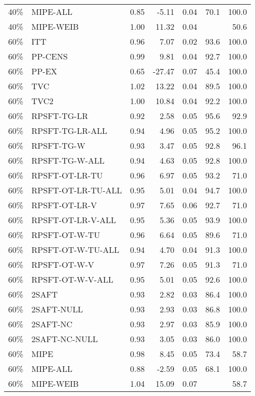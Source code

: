 \begin{table}[ht]
{\begin{tabular}{llrrrrr}
  40\% & MIPE-ALL & 0.85 & -5.11 & 0.04 & 70.1 & 100.0 \\ 
  40\% & MIPE-WEIB & 1.00 & 11.32 & 0.04 &  & 50.6 \\ 
   \hline
60\% & ITT & 0.96 & 7.07 & 0.02 & 93.6 & 100.0 \\ 
  60\% & PP-CENS & 0.99 & 9.81 & 0.04 & 92.7 & 100.0 \\ 
  60\% & PP-EX & 0.65 & -27.47 & 0.07 & 45.4 & 100.0 \\ 
  60\% & TVC & 1.02 & 13.22 & 0.04 & 89.5 & 100.0 \\ 
  60\% & TVC2 & 1.00 & 10.84 & 0.04 & 92.2 & 100.0 \\ 
   \hline
60\% & RPSFT-TG-LR & 0.92 & 2.58 & 0.05 & 95.6 & 92.9 \\ 
  60\% & RPSFT-TG-LR-ALL & 0.94 & 4.96 & 0.05 & 95.2 & 100.0 \\ 
  60\% & RPSFT-TG-W & 0.93 & 3.47 & 0.05 & 92.8 & 96.1 \\ 
  60\% & RPSFT-TG-W-ALL & 0.94 & 4.63 & 0.05 & 92.8 & 100.0 \\ 
  60\% & RPSFT-OT-LR-TU & 0.96 & 6.97 & 0.05 & 93.2 & 71.0 \\ 
  60\% & RPSFT-OT-LR-TU-ALL & 0.95 & 5.01 & 0.04 & 94.7 & 100.0 \\ 
  60\% & RPSFT-OT-LR-V & 0.97 & 7.65 & 0.06 & 92.7 & 71.0 \\ 
  60\% & RPSFT-OT-LR-V-ALL & 0.95 & 5.36 & 0.05 & 93.9 & 100.0 \\ 
   \hline
60\% & RPSFT-OT-W-TU & 0.96 & 6.64 & 0.05 & 89.6 & 71.0 \\ 
  60\% & RPSFT-OT-W-TU-ALL & 0.94 & 4.70 & 0.04 & 91.3 & 100.0 \\ 
  60\% & RPSFT-OT-W-V & 0.97 & 7.26 & 0.05 & 91.3 & 71.0 \\ 
  60\% & RPSFT-OT-W-V-ALL & 0.95 & 5.01 & 0.05 & 92.6 & 100.0 \\ 
   \hline
60\% & 2SAFT & 0.93 & 2.82 & 0.03 & 86.4 & 100.0 \\ 
  60\% & 2SAFT-NULL & 0.93 & 2.93 & 0.03 & 86.8 & 100.0 \\ 
  60\% & 2SAFT-NC & 0.93 & 2.97 & 0.03 & 85.9 & 100.0 \\ 
  60\% & 2SAFT-NC-NULL & 0.93 & 3.05 & 0.03 & 86.0 & 100.0 \\ 
  60\% & MIPE & 0.98 & 8.45 & 0.05 & 73.4 & 58.7 \\ 
  60\% & MIPE-ALL & 0.88 & -2.59 & 0.05 & 68.1 & 100.0 \\ 
  60\% & MIPE-WEIB & 1.04 & 15.09 & 0.07 &  & 58.7 \\ 
   \hline
\end{tabular}
}
\end{table}
